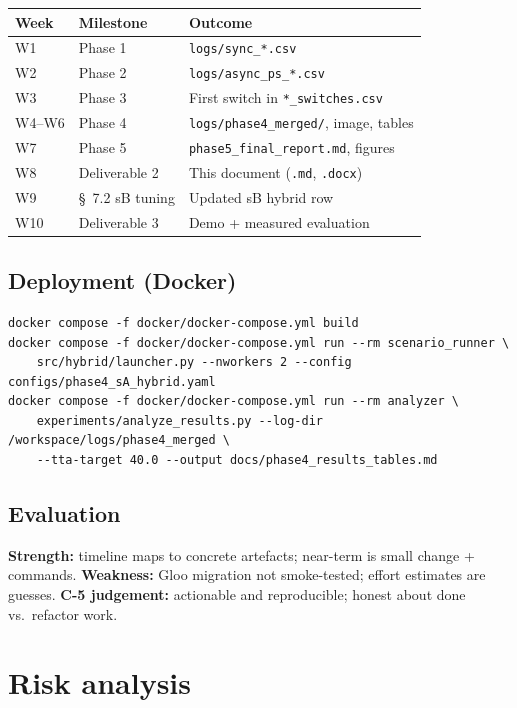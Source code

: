 \documentclass[11pt,a4paper]{article}
\begin{document}
\begin{table}[htbp]
  \centering
  \small
  \begin{tabularx}{\linewidth}{@{}l L L@{}}
    \toprule
    \textbf{Week} & \textbf{Milestone} & \textbf{Outcome} \\
    \midrule
    W1 & Phase 1 & \texttt{logs/sync\_*.csv} \\
    W2 & Phase 2 & \texttt{logs/async\_ps\_*.csv} \\
    W3 & Phase 3 & First switch in \texttt{*\_switches.csv} \\
    W4--W6 & Phase 4 & \texttt{logs/phase4\_merged/}, image, tables \\
    W7 & Phase 5 & \texttt{phase5\_final\_report.md}, figures \\
    W8 & Deliverable 2 & This document (\texttt{.md}, \texttt{.docx}) \\
    W9 & \S~7.2 sB tuning & Updated sB hybrid row \\
    W10 & Deliverable 3 & Demo + measured evaluation \\
    \bottomrule
  \end{tabularx}
\end{table}

\subsection{Deployment (Docker)}

\begin{lstlisting}[style=bashcode, caption={Rebuild and run (bash)}]
docker compose -f docker/docker-compose.yml build
docker compose -f docker/docker-compose.yml run --rm scenario_runner \
    src/hybrid/launcher.py --nworkers 2 --config configs/phase4_sA_hybrid.yaml
docker compose -f docker/docker-compose.yml run --rm analyzer \
    experiments/analyze_results.py --log-dir /workspace/logs/phase4_merged \
    --tta-target 40.0 --output docs/phase4_results_tables.md
\end{lstlisting}

\subsection{Evaluation}
\textbf{Strength:} timeline maps to concrete artefacts; near-term is small change + commands. \textbf{Weakness:} Gloo migration not smoke-tested; effort estimates are guesses. \textbf{C-5 judgement:} actionable and reproducible; honest about done vs.\ refactor work.

\section{Risk analysis}
\end{document}
